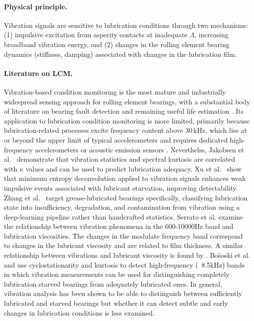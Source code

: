 \paragraph{Physical principle.} Vibration signals are sensitive to lubrication conditions through two mechanisms: (1) impulsive excitation from asperity contacts at inadequate $\Lambda$, increasing broadband vibration energy, and (2) changes in the rolling element bearing dynamics (stiffness, damping) associated with changes in the lubrication film.

\paragraph{Literature on LCM.} Vibration-based condition monitoring is the most mature and industrially widespread sensing approach for rolling element bearings, with a substantial body of literature on bearing fault detection and remaining useful life estimation \cite{randall_vibrationbased_2021,rai_review_2016}. Its application to lubrication condition monitoring is more limited, primarily because lubrication-related processes excite frequency content above 30\,kHz, which lies at or beyond the upper limit of typical accelerometers and requires dedicated high-frequency accelerometers or acoustic emission sensors \cite{jakobsen_detecting_2023}. Neverthelss, Jakobsen et al.\ \cite{jakobsen_vibration_2021} demonstrate that vibration statistics and spectral kurtosis are correlated with $\kappa$ values and can be used to predict lubrication adequacy. Xu et al.\ \cite{xu_vibration-based_2024} show that minimum entropy deconvolution applied to vibration signals enhances weak impulsive events associated with lubricant starvation, improving detectability. Zhang et al.\ \cite{zhang_interpretable_2026} target grease-lubricated bearings specifically, classifying lubrication state into insufficiency, degradation, and contamination from vibration using a deep-learning pipeline rather than handcrafted statistics. Serrato et al. \cite{serrato_effect_2007} examine the relationship between vibration phenomena in the 600-10000Hz band and lubrication viscosities. The changes in the modulate frequency band correspond to changes in the lubricant viscosity and are related to film thickness. A similar relationship between vibrations and lubricant viscosity is found by \cite{su_signature_1992}. Bo\u{s}oski et al. \cite{boskoski_detection_2010} and use cyclostationarity and kurtosis to detect high-frequency (~8.5kHz) bands in which vibration measurements can be used for distinguishing completely lubrication starved bearings from adequately lubricated ones. In general, vibration analysis has been shown to be able to distinguish between sufficiently lubricated and starved bearings but whether it can detect subtle and early changes in lubrication conditions is less examined.

